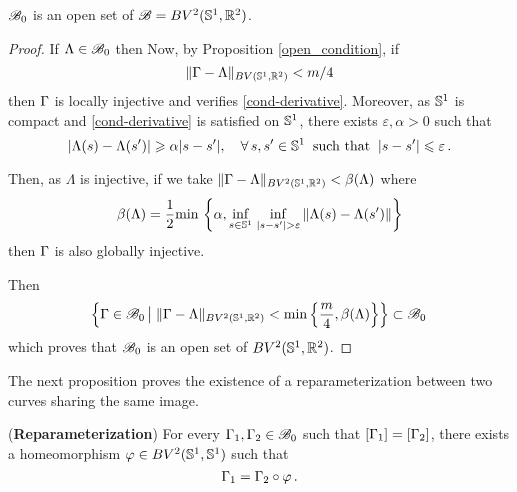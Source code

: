\begin{prop}\label{openB0}   
	$\mathcal{B}_0$ is an open set  of $\mathcal{B}=BV^2(\mathbb{S}^1, \mathbb{R}^2)$. 
\end{prop}

\begin{proof}
If $\Lambda\in \mathcal{B}_0$ then 
Now, by Proposition \ref{open_condition}, if $$\|\Gamma - \Lambda\|_{BV(\mathbb{S}^1, \mathbb{R}^2)}< m/4$$ then $\Gamma$ is locally injective and verifies \eqref{cond-derivative}. 
Moreover, as $\mathbb{S}^1$ is compact and \eqref{cond-derivative} is satisfied on $\mathbb{S}^1$, there exists $\varepsilon,\alpha>0$  such that
\begin{equation}\label{local-injective}
|\Lambda(s)-\Lambda(s')|\geqslant \alpha|s-s'|, \quad \forall\,s,s'\in\mathbb{S}^1\;\; \mbox{such that}\;\;|s-s'|\leqslant \varepsilon\,.
\end{equation}

Then, as $\Lambda$ is injective, if we take $\|\Gamma - \Lambda\|_{BV^2(\mathbb{S}^1,\mathbb{R}^2)}< \beta(\Lambda)$ where 
$$\beta(\Lambda) = \frac{1}{2}\mbox{min}\,\left\{\alpha, \underset{s\in\Circ}{\inf}\;\underset{|s-s'|> \varepsilon}{\inf}\,\|\Lambda(s)-\Lambda(s')\|\right\}$$
then  $\Gamma$ is also globally injective.
\par Then
$$\left\{\Gamma\in \mathcal{B}_0\, \big| \;\|\Gamma - \Lambda\|_{BV^2(\mathbb{S}^1, \mathbb{R}^2)}< {\rm{min}}\left\{\frac{m}{4}, \beta(\Lambda)\right\}\right\}\subset \mathcal{B}_0\, $$
which proves that $\mathcal{B}_0$ is an open set of $ BV^2(\mathbb{S}^1, \mathbb{R}^2)$.
\end{proof} 
  


The next proposition proves the existence of a reparameterization between two curves sharing the same image. 
\begin{prop}\label{reparameterization}({\bf Reparameterization})
For every  $\Gamma_1, \Gamma_2\in \mathcal{B}_0$ such that $[\Gamma_1]=[\Gamma_2]$,  there exists a homeomorphism  $\varphi\in BV^2(\mathbb{S}^1,\mathbb{S}^1)$ such that 
$$\Gamma_1=\Gamma_2\circ\varphi \,.$$
\end{prop}

